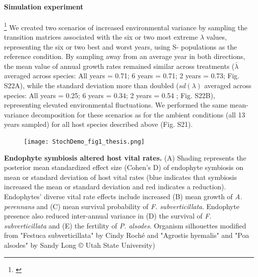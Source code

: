 \documentclass[12pt]{article}
\newcommand{\tom}[2]{{\color{red}{#1}}\footnote{\textit{\color{red}{#2}}}}
\begin{document}
\paragraph*{Simulation experiment} \tom{To create scenarios of increased variance relative to that observed during the study period, we repeated the stochastic growth rate estimation and decomposition, but sampling only a subset of the 14 observed annual transition matrices. }{Elsewhere you say it was 13 transition matrices.}
We created two scenarios of increased environmental variance by sampling the transition matrices associated with the six or two most extreme $\lambda$ values, representing the six or two best and worst years, using S- populations as the reference condition. 
By sampling away from an average year in both directions, the mean value of annual growth rates remained similar across treatments ($\bar{\lambda}$ averaged across species: All years = 0.71; 6 years = 0.71; 2 years = 0.73; Fig. S22A), while the standard deviation more than doubled ($sd(\lambda)$ averaged across species: All years = 0.25; 6 years = 0.34; 2 years = 0.54 ; Fig. S22B), representing elevated environmental fluctuations.
We performed the same mean-variance decomposition for these scenarios as for the ambient conditions (all 13 years sampled) for all host species described above (Fig. S21). 









\clearpage


\begin{figure}
	\centering
	\texttt{[image: StochDemo\_fig1\_thesis.png]}
\end{figure}
 \textbf{Endophyte symbiosis altered host vital rates.} (A) Shading represents the posterior mean standardized effect size (Cohen's D) of endophyte symbiosis on mean or standard deviation of host vital rates (blue indicates that symbiosis increased the mean or standard deviation and red indicates a reduction). Endophytes' diverse vital rate effects include increased (B) mean growth of \emph{A. perennans} and (C) mean survival probability of \emph{F. subverticillata}. Endophyte presence also reduced inter-annual variance in (D) the survival of \emph{F. subverticillata} and (E) the fertility of \emph{P. alsodes}. Organism silhouettes modified from "Festuca subverticillata" by Cindy Roché and "Agrostis hyemalis" and "Poa alsodes" by Sandy Long © Utah State University)
\newpage
\end{document}
